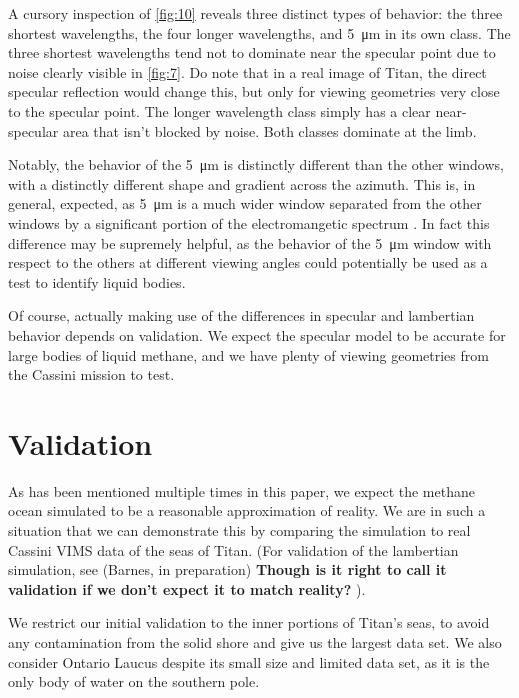 \documentclass[linenumbers]{aastex631}
\begin{document}
A cursory inspection of \ref{fig:10} reveals three distinct types of behavior: the three shortest wavelengths, the four longer wavelengths, and \qty{5}{\micro\meter} in its own class. The three shortest wavelengths tend not to dominate near the specular point due to noise clearly visible in \ref{fig:7}. Do note that in a real image of Titan, the direct specular reflection would change this, but only for viewing geometries very close to the specular point. The longer wavelength class simply has a clear near-specular area that isn't blocked by noise. Both classes dominate at the limb. 

Notably, the behavior of the \qty{5}{\micro\meter} is distinctly different than the other windows, with a distinctly different shape and gradient across the azimuth. This is, in general, expected, as \qty{5}{\micro\meter} is a much wider window separated from the other windows by a significant portion of the electromangetic spectrum \cite{EsSayeh2023}. In fact this difference may be supremely helpful, as the behavior of the \qty{5}{\micro\meter} window with respect to the others at different viewing angles could potentially be used as a test to identify liquid bodies. 

Of course, actually making use of the differences in specular and lambertian behavior depends on validation. We expect the specular model to be accurate for large bodies of liquid methane, and we have plenty of viewing geometries from the Cassini mission to test.

\section{Validation}

As has been mentioned multiple times in this paper, we expect the methane ocean simulated to be a reasonable approximation of reality. We are in such a situation that we can demonstrate this by comparing the simulation to real Cassini VIMS data of the seas of Titan. (For validation of the lambertian simulation, see (Barnes, in preparation) \textbf{\color{red} Though is it right to call it validation if we don't expect it to match reality? \color{black}}). 

We restrict our initial validation to the inner portions of Titan's seas, to avoid any contamination from the solid shore and give us the largest data set. We also consider Ontario Laucus despite its small size and limited data set, as it is the only body of water on the southern pole. 
\end{document}
